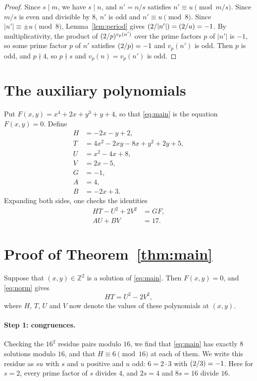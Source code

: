 \documentclass[11pt]{article}
\newcommand{\Z}{\mathbb{Z}}
\newcommand{\leg}[2]{\mathchoice{\biggl(\dfrac{#1}{#2}\biggr)}{(#1/#2)}{(#1/#2)}{(#1/#2)}}
\begin{document}
\begin{proof}
Since $s\mid m$, we have $s\mid n$, and $n'=n/s$ satisfies $n'\equiv u\pmod{m/s}$. Since $m/s$ is even and divisible by $8$, $n'$ is odd and $n'\equiv u\pmod{8}$. Since $|n'|\equiv\pm u\pmod{8}$, Lemma~\ref{lem:period} gives $\leg{2}{|n'|}=\leg{2}{u}=-1$. By multiplicativity, the product of $\leg{2}{p}^{v_p(n')}$ over the prime factors $p$ of $|n'|$ is $-1$, so some prime factor $p$ of $n'$ satisfies $\leg{2}{p}=-1$ and $v_p(n')$ is odd. Then $p$ is odd, and $p\nmid4$, so $p\nmid s$ and $v_p(n)=v_p(n')$ is odd.
\end{proof}

\section{The auxiliary polynomials}

Put $F(x,y)=x^{4}+2x+y^{3}+y+4$, so that \eqref{eq:main} is the equation $F(x,y)=0$. Define
\begin{align*}
H&=-2x-y+2,\\
T&=4x^{2}-2xy-8x+y^{2}+2y+5,\\
U&=x^{2}-4x+8,\\
V&=2x-5,\\
G&=-1,\\
A&=4,\\
B&=-2x+3.
\end{align*}
Expanding both sides, one checks the identities
\begin{align}
HT-U^2+2V^2&=GF,\label{eq:norm}\\
AU+BV&=17.\label{eq:bezout}
\end{align}

\section{Proof of Theorem~\ref{thm:main}}

Suppose that $(x,y)\in\Z^2$ is a solution of \eqref{eq:main}. Then $F(x,y)=0$, and \eqref{eq:norm} gives
\begin{equation}\label{eq:HT}
HT=U^2-2V^2,
\end{equation}
where $H$, $T$, $U$ and $V$ now denote the values of these polynomials at $(x,y)$.

\paragraph{Step 1: congruences.} Checking the $16^2$ residue pairs modulo $16$, we find that \eqref{eq:main} has exactly 8 solutions modulo $16$, and that $H\equiv6\pmod{16}$ at each of them. We write this residue as $su$ with $s$ and $u$ positive and $u$ odd: $6=2\cdot3$ with $\leg{2}{3}=-1$. Here for $s=2$, every prime factor of $s$ divides $4$, and $2s=4$ and $8s=16$ divide $16$.
\end{document}
